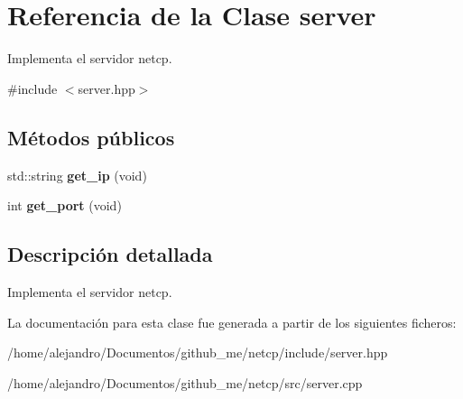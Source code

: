 \hypertarget{classserver}{}\section{Referencia de la Clase server}
\label{classserver}


Implementa el servidor netcp.  




{\ttfamily \#include $<$server.\+hpp$>$}

\subsection*{Métodos públicos}
\begin{DoxyCompactItemize}
\item 
\mbox{\label{classserver_aa3ffb6541d4295c59a04ca6d72a8bed4}} 
std\+::string {\bfseries get\+\_\+ip} (void)
\item 
\mbox{\label{classserver_a85c34ce8e949d74f068025b11bd04bcc}} 
int {\bfseries get\+\_\+port} (void)
\end{DoxyCompactItemize}


\subsection{Descripción detallada}
Implementa el servidor netcp. 

La documentación para esta clase fue generada a partir de los siguientes ficheros\+:\begin{DoxyCompactItemize}
\item 
/home/alejandro/\+Documentos/github\+\_\+me/netcp/include/server.\+hpp\item 
/home/alejandro/\+Documentos/github\+\_\+me/netcp/src/server.\+cpp\end{DoxyCompactItemize}
